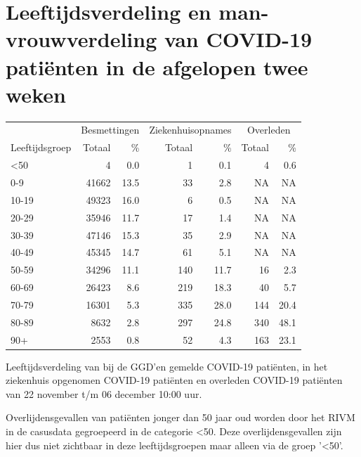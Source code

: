 \documentclass[
  english,
  man,floatsintext]{apa6}
\begin{document}
\hypertarget{leeftijdsverdeling-en-man-vrouwverdeling-van-covid-19-patiuxebnten-in-de-afgelopen-twee-weken}{%
\section{Leeftijdsverdeling en man-vrouwverdeling van COVID-19 patiënten in de afgelopen twee weken}\label{leeftijdsverdeling-en-man-vrouwverdeling-van-covid-19-patiuxebnten-in-de-afgelopen-twee-weken}}

\begin{table}
\centering\begingroup\fontsize{11}{13}\selectfont

\begin{threeparttable}
\begin{tabular}{lrrrrrr}
\toprule
\multicolumn{1}{c}{ } & \multicolumn{2}{c}{Besmettingen} & \multicolumn{2}{c}{Ziekenhuisopnames} & \multicolumn{2}{c}{Overleden} \\
\cmidrule(l{3pt}r{3pt}){2-3} \cmidrule(l{3pt}r{3pt}){4-5} \cmidrule(l{3pt}r{3pt}){6-7}
Leeftijdsgroep & Totaal & \% & Totaal & \% & Totaal & \%\\
\midrule
<50 & 4 & 0.0 & 1 & 0.1 & 4 & 0.6\\
0-9 & 41662 & 13.5 & 33 & 2.8 & NA & NA\\
10-19 & 49323 & 16.0 & 6 & 0.5 & NA & NA\\
20-29 & 35946 & 11.7 & 17 & 1.4 & NA & NA\\
30-39 & 47146 & 15.3 & 35 & 2.9 & NA & NA\\
40-49 & 45345 & 14.7 & 61 & 5.1 & NA & NA\\
50-59 & 34296 & 11.1 & 140 & 11.7 & 16 & 2.3\\
60-69 & 26423 & 8.6 & 219 & 18.3 & 40 & 5.7\\
70-79 & 16301 & 5.3 & 335 & 28.0 & 144 & 20.4\\
80-89 & 8632 & 2.8 & 297 & 24.8 & 340 & 48.1\\
90+ & 2553 & 0.8 & 52 & 4.3 & 163 & 23.1\\
\bottomrule
\end{tabular}
\begin{tablenotes}
\item[1] Leeftijdsverdeling van bij de GGD’en gemelde COVID-19 patiënten, in het ziekenhuis opgenomen COVID-19 patiënten en overleden COVID-19 patiënten van 22 november t/m 06 december 10:00 uur.
\item[2] Overlijdensgevallen van patiënten jonger dan 50 jaar oud worden door het RIVM in de casusdata gegroepeerd in de categorie <50. Deze overlijdensgevallen zijn hier dus niet zichtbaar in deze leeftijdsgroepen maar alleen via de groep '<50'.
\end{tablenotes}
\end{threeparttable}
\endgroup{}
\end{table}
\end{document}
